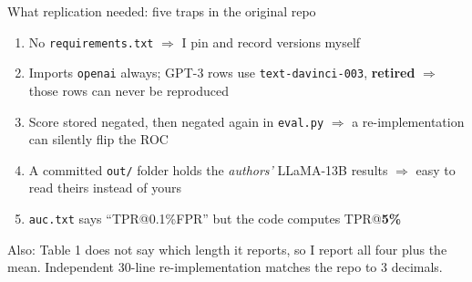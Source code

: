 \documentclass[aspectratio=169,10pt]{beamer}
\newcommand{\muted}[1]{{\color{ink2}#1}}
\begin{document}
\begin{frame}{What replication needed: five traps in the original repo}
  \begin{enumerate}\setlength\itemsep{3pt}
    \item No \texttt{requirements.txt} $\Rightarrow$ I pin and record versions myself
    \item Imports \texttt{openai} always; GPT-3 rows use \texttt{text-davinci-003}, \textbf{retired}
          \muted{$\Rightarrow$ those rows can never be reproduced}
    \item Score stored negated, then negated again in \texttt{eval.py}
          \muted{$\Rightarrow$ a re-implementation can silently flip the ROC}
    \item A committed \texttt{out/} folder holds the \emph{authors'} LLaMA-13B results
          \muted{$\Rightarrow$ easy to read theirs instead of yours}
    \item \texttt{auc.txt} says ``TPR@0.1\%FPR'' but the code computes TPR@\textbf{5\%}
  \end{enumerate}
  \vspace{0.3em}
  \muted{Also: Table 1 does not say which length it reports, so I report all four plus the mean.
  Independent 30-line re-implementation matches the repo to 3 decimals.}
\end{frame}
\end{document}
